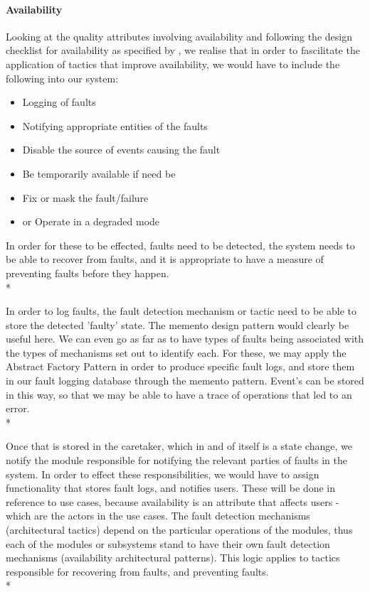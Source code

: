 \documentclass[11pt]{article}
\begin{document}
\paragraph{Availability}
Looking at the quality attributes involving availability and following the design checklist for availability as specified by \cite{Book:2}, we realise that in order to fascilitate the application of tactics that improve availability, we would have to include the following into our system:
\begin{itemize}
	\item[] Logging of faults
	\item[] Notifying appropriate entities of the faults
	\item[] Disable the source of events causing the fault
	\item[] Be temporarily available if need be
	\item[] Fix or mask the fault/failure
	\item[] or Operate in a degraded mode
\end{itemize}

In order for these to be effected, faults need to be detected, the system needs to be able to recover from faults, and it is appropriate to have a measure of preventing faults before they happen.\\*

In order to log faults, the fault detection mechanism or tactic need to be able to store the detected 'faulty' state. The memento design pattern would clearly be useful here. We can even go as far as to have types of faults being associated with the types of mechanisms set out to identify each. For these, we may apply the Abstract Factory Pattern in order to produce specific fault logs, and store them in our fault logging database through the memento pattern. Event's can be stored in this way, so that we may be able to have a trace of operations that led to an error.\\*

Once that is stored in the caretaker, which in and of itself is a state change, we notify the module responsible for notifying the relevant parties of faults in the system. In order to effect these responsibilities, we would have to assign functionality that stores fault logs, and notifies users. These will be done in reference to use cases, because availability is an attribute that affects users - which are the actors in the use cases. The fault detection mechanisms (architectural tactics) depend on the particular operations of the modules, thus each of the modules or subsystems stand to have their own fault detection mechanisms (availability architectural patterns). This logic applies to tactics responsible for recovering from faults, and preventing faults.\\*
\end{document}
